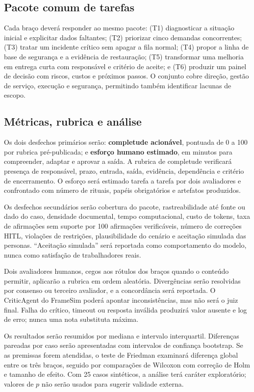 \subsection{Pacote comum de tarefas}

Cada braço deverá responder ao mesmo pacote: (T1) diagnosticar a situação inicial e explicitar dados faltantes; (T2) priorizar cinco demandas concorrentes; (T3) tratar um incidente crítico sem apagar a fila normal; (T4) propor a linha de base de segurança e a evidência de restauração; (T5) transformar uma melhoria em entrega curta com responsável e critério de aceite; e (T6) produzir um painel de decisão com riscos, custos e próximos passos. O conjunto cobre direção, gestão de serviço, execução e segurança, permitindo também identificar lacunas de escopo.

\subsection{Métricas, rubrica e análise}

Os dois desfechos primários serão: \textbf{completude acionável}, pontuada de 0 a 100 por rubrica pré-publicada; e \textbf{esforço humano estimado}, em minutos para compreender, adaptar e aprovar a saída. A rubrica de completude verificará presença de responsável, prazo, entrada, saída, evidência, dependência e critério de encerramento. O esforço será estimado tarefa a tarefa por dois avaliadores e confrontado com número de rituais, papéis obrigatórios e artefatos produzidos.

Os desfechos secundários serão cobertura do pacote, rastreabilidade até fonte ou dado do caso, densidade documental, tempo computacional, custo de tokens, taxa de afirmações sem suporte por 100 afirmações verificáveis, número de correções HITL, violações de restrições, plausibilidade do cenário e aceitação simulada das personas. ``Aceitação simulada'' será reportada como comportamento do modelo, nunca como satisfação de trabalhadores reais.

Dois avaliadores humanos, cegos aos rótulos dos braços quando o conteúdo permitir, aplicarão a rubrica em ordem aleatória. Divergências serão resolvidas por consenso ou terceiro avaliador, e a concordância será reportada. O CriticAgent do FrameSim poderá apontar inconsistências, mas não será o juiz final. Falha do crítico, timeout ou resposta inválida produzirá valor ausente e log de erro; nunca uma nota substituta máxima.

Os resultados serão resumidos por mediana e intervalo interquartil. Diferenças pareadas por caso serão apresentadas com intervalos de confiança bootstrap. Se as premissas forem atendidas, o teste de Friedman examinará diferença global entre os três braços, seguido por comparações de Wilcoxon com correção de Holm e tamanho de efeito. Com 25 casos sintéticos, a análise terá caráter exploratório; valores de $p$ não serão usados para sugerir validade externa.

